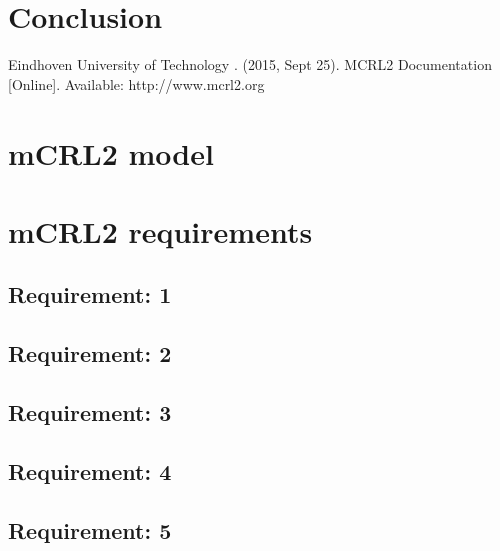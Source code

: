 \documentclass[a4paper,twoside,11pt]{article}
\begin{document}
\section{Conclusion}


\begin{thebibliography}{9}
Eindhoven University of Technology . (2015, Sept 25). MCRL2 Documentation [Online]. Available: http://www.mcrl2.org

\end{thebibliography}

\newpage
\begin{appendices}
\section{mCRL2 model} \cbstart
 \cbend

\newpage
\section{mCRL2 requirements}

%	

	\subsection{Requirement: 1}
	
	\subsection{Requirement: 2} \cbstart
	
	\cbend
	\subsection{Requirement: 3} \cbstart
	
	\cbend
	\subsection{Requirement: 4} \cbstart
	
	\cbend
	\subsection{Requirement: 5}
	

\end{appendices}
\end{document}
